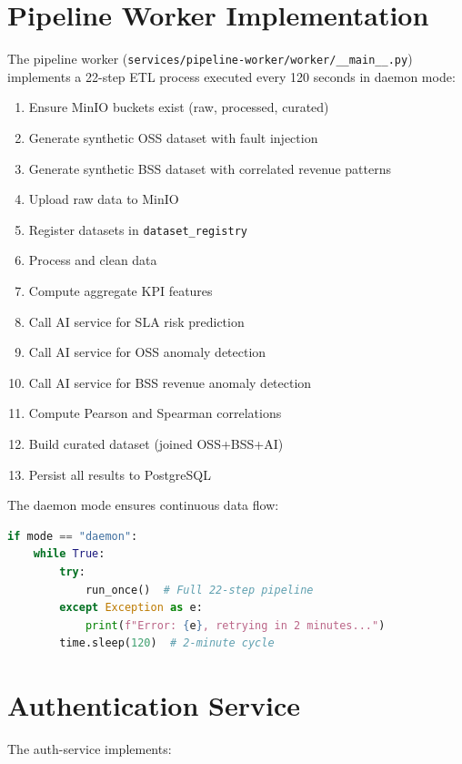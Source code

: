 \section{Pipeline Worker Implementation}

The pipeline worker (\texttt{services/pipeline-worker/worker/\_\_main\_\_.py}) implements a 22-step ETL process executed every 120 seconds in daemon mode:

\begin{enumerate}
    \item Ensure MinIO buckets exist (raw, processed, curated)
    \item Generate synthetic OSS dataset with fault injection
    \item Generate synthetic BSS dataset with correlated revenue patterns
    \item Upload raw data to MinIO
    \item Register datasets in \texttt{dataset\_registry}
    \item Process and clean data
    \item Compute aggregate KPI features
    \item Call AI service for SLA risk prediction
    \item Call AI service for OSS anomaly detection
    \item Call AI service for BSS revenue anomaly detection
    \item Compute Pearson and Spearman correlations
    \item Build curated dataset (joined OSS+BSS+AI)
    \item Persist all results to PostgreSQL
\end{enumerate}

The daemon mode ensures continuous data flow:

\begin{lstlisting}[language=Python, caption={Pipeline daemon mode}]
if mode == "daemon":
    while True:
        try:
            run_once()  # Full 22-step pipeline
        except Exception as e:
            print(f"Error: {e}, retrying in 2 minutes...")
        time.sleep(120)  # 2-minute cycle
\end{lstlisting}

\section{Authentication Service}

The auth-service implements:

